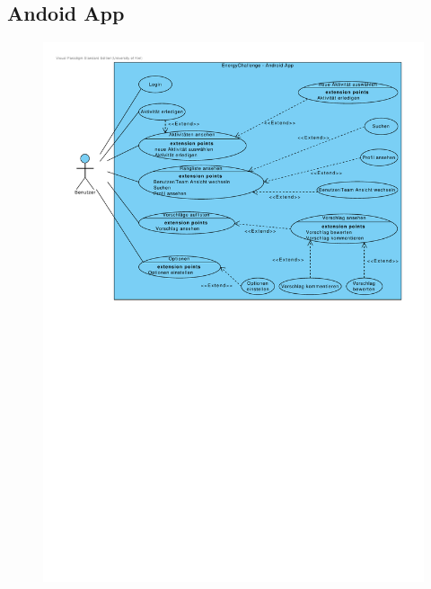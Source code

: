 \documentclass[10pt,a4paper]{article}
\begin{document}
\subsection{Andoid App}
\begin{figure}[h!]
		\includegraphics[width=\linewidth]{gfx/androidapp/overview.pdf}
	\end{figure}
\end{document}

